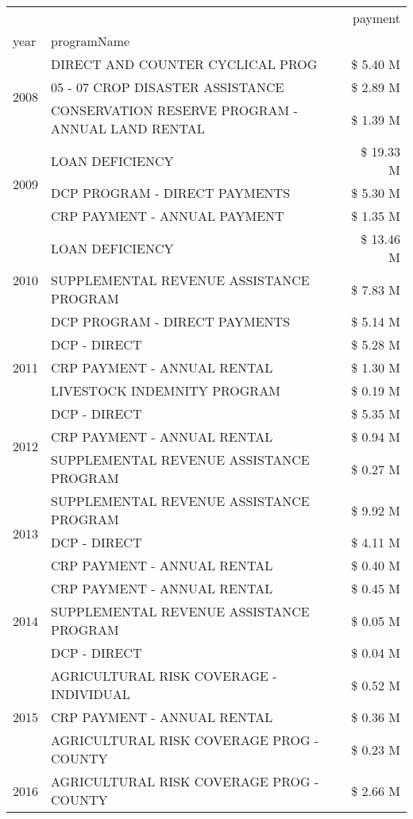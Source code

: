 \begin{tabular}{llr}
\toprule
 &  & payment \\
year & programName &  \\
\midrule
\multirow[t]{3}{*}{2008} & DIRECT AND COUNTER CYCLICAL PROG & \$ 5.40 M \\
 & 05 - 07 CROP DISASTER ASSISTANCE & \$ 2.89 M \\
 & CONSERVATION RESERVE PROGRAM - ANNUAL LAND RENTAL & \$ 1.39 M \\
\cline{1-3}
\multirow[t]{3}{*}{2009} & LOAN DEFICIENCY & \$ 19.33 M \\
 & DCP PROGRAM - DIRECT PAYMENTS & \$ 5.30 M \\
 & CRP PAYMENT - ANNUAL PAYMENT & \$ 1.35 M \\
\cline{1-3}
\multirow[t]{3}{*}{2010} & LOAN DEFICIENCY & \$ 13.46 M \\
 & SUPPLEMENTAL REVENUE ASSISTANCE PROGRAM & \$ 7.83 M \\
 & DCP PROGRAM - DIRECT PAYMENTS & \$ 5.14 M \\
\cline{1-3}
\multirow[t]{3}{*}{2011} & DCP - DIRECT & \$ 5.28 M \\
 & CRP PAYMENT - ANNUAL RENTAL & \$ 1.30 M \\
 & LIVESTOCK INDEMNITY PROGRAM & \$ 0.19 M \\
\cline{1-3}
\multirow[t]{3}{*}{2012} & DCP - DIRECT & \$ 5.35 M \\
 & CRP PAYMENT - ANNUAL RENTAL & \$ 0.94 M \\
 & SUPPLEMENTAL REVENUE ASSISTANCE PROGRAM & \$ 0.27 M \\
\cline{1-3}
\multirow[t]{3}{*}{2013} & SUPPLEMENTAL REVENUE ASSISTANCE PROGRAM & \$ 9.92 M \\
 & DCP - DIRECT & \$ 4.11 M \\
 & CRP PAYMENT - ANNUAL RENTAL & \$ 0.40 M \\
\cline{1-3}
\multirow[t]{3}{*}{2014} & CRP PAYMENT - ANNUAL RENTAL & \$ 0.45 M \\
 & SUPPLEMENTAL REVENUE ASSISTANCE PROGRAM & \$ 0.05 M \\
 & DCP - DIRECT & \$ 0.04 M \\
\cline{1-3}
\multirow[t]{3}{*}{2015} & AGRICULTURAL RISK COVERAGE - INDIVIDUAL & \$ 0.52 M \\
 & CRP PAYMENT - ANNUAL RENTAL & \$ 0.36 M \\
 & AGRICULTURAL RISK COVERAGE PROG - COUNTY & \$ 0.23 M \\
\cline{1-3}
\multirow[t]{3}{*}{2016} & AGRICULTURAL RISK COVERAGE PROG - COUNTY & \$ 2.66 M \\

\end{tabular}
